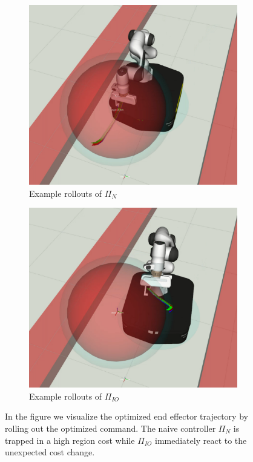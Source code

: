 \begin{figure}[t]
\centering
\begin{subfigure}{0.48\columnwidth}
    \includegraphics[width=\linewidth]{figures/obstacle_avoidance/rollouts_no_filter.pdf}
    \caption{Example rollouts of $\Pi_{N}$}
\end{subfigure}%
\hfill
\begin{subfigure}{0.48\columnwidth}
    \includegraphics[width=\linewidth]{figures/obstacle_avoidance/rollouts_filter.pdf}
    \caption{Example rollouts of $\Pi_{IO}$}
\end{subfigure}%
\hfill
\caption{In the figure we visualize the optimized end effector trajectory by rolling out the optimized command. The naive controller $\Pi_{N}$ is trapped in a high region cost while $\Pi_{IO}$ immediately react to the unexpected cost change.}\label{fig:rollouts_comparison}
\end{figure}

